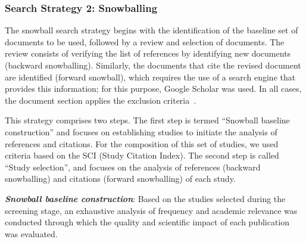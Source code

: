 \subsubsection{Search Strategy 2: Snowballing}

\newcommand{\csiSelected}{24} %
\newcommand{\newSnowballStudies}{3} %
\newcommand{\firstBackwardSnowballStudies}{3} %
\newcommand{\firstForwardSnowballStudies}{4} %
\newcommand{\secondBackwardSnowballStudies}{3} %
\newcommand{\secondForwardSnowballStudies}{5} %

\newcommand{\firstSnowballIterationStudies}{\fpeval{\firstBackwardSnowballStudies+\firstForwardSnowballStudies}}
\newcommand{\secondSnowballIterationStudies}{\fpeval{\secondBackwardSnowballStudies+\secondForwardSnowballStudies}}

\newcommand{\snowballNewStudies}{\fpeval{\firstSnowballIterationStudies+\secondSnowballIterationStudies}}




The snowball search strategy begins with the identification of the baseline set of documents to be used, followed by a review and selection of documents. The review consists of verifying the list of references by identifying new documents (backward snowballing). Similarly, the documents that cite the revised document are identified (forward snowball), which requires the use of a search engine that provides this information; for this purpose, Google Scholar was used. In all cases, the document section applies the exclusion criteria~\cite{Wohlin-01}.

This strategy comprises two steps. The first step is termed ``Snowball baseline construction'' and focuses on establishing studies to initiate the analysis of references and citations. For the composition of this set of studies, we used criteria based on the SCI (Study Citation Index). The second step is called ``Study selection'', and focuses on the analysis of references (backward snowballing) and citations (forward snowballing) of each study.


\textit{\textbf{Snowball baseline construction}}: Based on the \screenTot{} studies selected during the screening stage, an exhaustive analysis of frequency and academic relevance was conducted through which the quality and scientific impact of each publication was evaluated.

